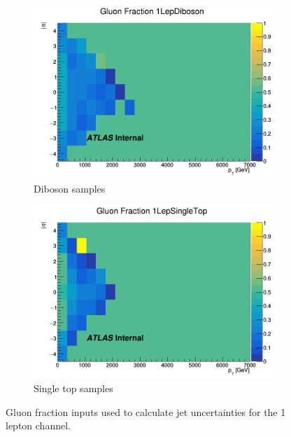 \begin{figure}[p]
    \begin{subfigure}[b]{0.3\textwidth}
        \centering
        \includegraphics[width=\textwidth]{figures/QGfrac/GluonFrac2D_1LepDiboson.png}
        \caption{Diboson samples}
        \label{fig:GluonFracDiboson}
    \end{subfigure}
    \begin{subfigure}[b]{0.3\textwidth}
        \centering
        \includegraphics[width=\textwidth]{figures/QGfrac/GluonFrac2D_1LepSingleTop.png}
        \caption{Single top samples}
        \label{fig:GluonFracSingleTop}
    \end{subfigure}
    \hfill

    \caption{Gluon fraction inputs used to calculate jet uncertainties for the 1 lepton channel.}
    \label{fig:QGFracInputs2D1Lep}
\end{figure}


